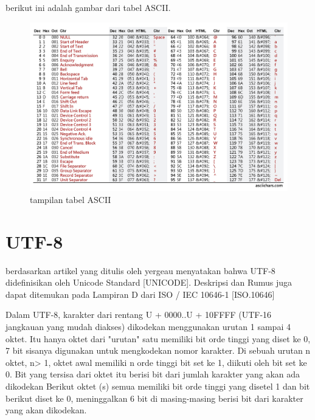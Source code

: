  	berikut ini adalah gambar dari tabel ASCII.
 	\begin{figure}[ht]
\centerline{\includegraphics[width=1\textwidth]{figures/ASCII.JPG}}
\caption{tampilan tabel ASCII}
\label{ASCII}
\end{figure}

	\section{UTF-8}
	 berdasarkan artikel yang ditulis oleh yergeau menyatakan bahwa \cite{yergeau1996utf}
		UTF-8 didefinisikan oleh Unicode Standard [UNICODE]. Deskripsi dan
   Rumus juga dapat ditemukan pada Lampiran D dari ISO / IEC 10646-1 [ISO.10646]

   Dalam UTF-8, karakter dari rentang U + 0000..U + 10FFFF (UTF-16
   jangkauan yang mudah diakses) dikodekan menggunakan urutan 1 sampai 4 oktet. Itu
   hanya oktet dari "urutan" satu memiliki bit orde tinggi yang diset ke 0,
   7 bit sisanya digunakan untuk mengkodekan nomor karakter. Di sebuah
   urutan n oktet, n> 1, oktet awal memiliki n orde tinggi
   bit set ke 1, diikuti oleh bit set ke 0. Bit yang tersisa dari
   oktet itu berisi bit dari jumlah karakter yang akan ada
   dikodekan Berikut oktet (s) semua memiliki bit orde tinggi yang disetel
   1 dan bit berikut diset ke 0, meninggalkan 6 bit di masing-masing berisi
   bit dari karakter yang akan dikodekan.

